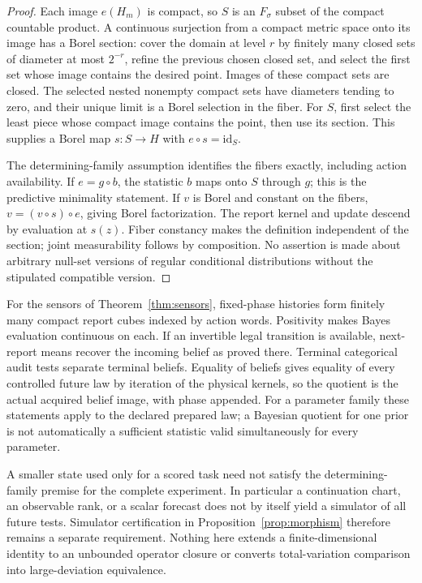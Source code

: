 \begin{proof}
Each image $e(H_m)$ is compact, so $S$ is an $F_\sigma$ subset of the compact countable product. A continuous surjection from a compact metric space onto its image has a Borel section: cover the domain at level $r$ by finitely many closed sets of diameter at most $2^{-r}$, refine the previous chosen closed set, and select the first set whose image contains the desired point. Images of these compact sets are closed. The selected nested nonempty compact sets have diameters tending to zero, and their unique limit is a Borel selection in the fiber. For $S$, first select the least piece whose compact image contains the point, then use its section. This supplies a Borel map $s:S\to H$ with $e\circ s=\mathrm{id}_S$.

The determining-family assumption identifies the fibers exactly, including action availability. If $e=g\circ b$, the statistic $b$ maps onto $S$ through $g$; this is the predictive minimality statement. If $v$ is Borel and constant on the fibers, $v=(v\circ s)\circ e$, giving Borel factorization. The report kernel and update descend by evaluation at $s(z)$. Fiber constancy makes the definition independent of the section; joint measurability follows by composition. No assertion is made about arbitrary null-set versions of regular conditional distributions without the stipulated compatible version.
\end{proof}

For the sensors of Theorem~\ref{thm:sensors}, fixed-phase histories form finitely many compact report cubes indexed by action words. Positivity makes Bayes evaluation continuous on each. If an invertible legal transition is available, next-report means recover the incoming belief as proved there. Terminal categorical audit tests separate terminal beliefs. Equality of beliefs gives equality of every controlled future law by iteration of the physical kernels, so the quotient is the actual acquired belief image, with phase appended. For a parameter family these statements apply to the declared prepared law; a Bayesian quotient for one prior is not automatically a sufficient statistic valid simultaneously for every parameter.

A smaller state used only for a scored task need not satisfy the determining-family premise for the complete experiment. In particular a continuation chart, an observable rank, or a scalar forecast does not by itself yield a simulator of all future tests. Simulator certification in Proposition~\ref{prop:morphism} therefore remains a separate requirement. Nothing here extends a finite-dimensional identity to an unbounded operator closure or converts total-variation comparison into large-deviation equivalence.
